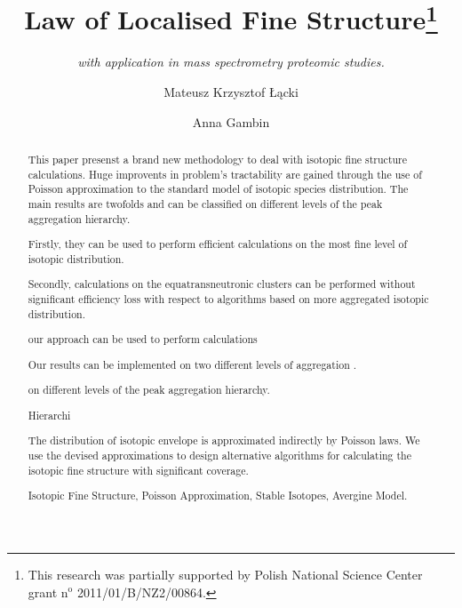 \documentclass[runningheads,a4paper]{llncs}
\newcommand{\keywords}[1]{\par\addvspace\baselineskip
\noindent\keywordname\enspace\ignorespaces#1}
\begin{document}
\mainmatter  

\title{Law of Localised Fine Structure\thanks{
	This research was partially supported by Polish National Science Center grant $\text{n}^\text{o}$ 2011/01/B/NZ2/00864.
}}

\subtitle{\textit{with application in mass spectrometry proteomic studies.}}


\author{Mateusz Krzysztof \L\k{a}cki
\and Anna Gambin}





\maketitle

\begin{abstract}
	This paper presenst a brand new methodology to deal with isotopic fine structure calculations. Huge improvents in problem's tractability are gained through the use of Poisson approximation to the standard model of isotopic species distribution. The main results are twofolds and can be classified on different levels of the peak aggregation hierarchy. 

	Firstly, they can be used to perform efficient calculations on the most fine level of isotopic distribution. 

	Secondly, calculations on the equatransneutronic clusters can be performed without significant efficiency loss with respect to algorithms based on more aggregated isotopic distribution. 

	our approach can be used to perform calculations 

	Our results can be implemented on two different levels of aggregation .

	on different levels of the peak aggregation hierarchy. 

	Hierarchi	

The distribution of isotopic envelope is approximated indirectly by Poisson laws. We use the devised approximations to design alternative algorithms for calculating the isotopic fine structure with significant coverage. 
\keywords{Isotopic Fine Structure, Poisson Approximation, Stable Isotopes, Avergine Model.}
\end{abstract}
\end{document}
